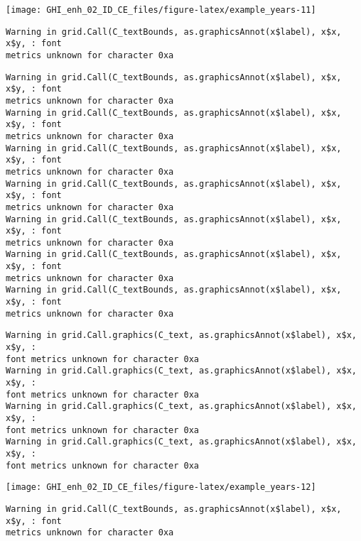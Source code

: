 \documentclass[
  10pt,
  a4paper,oneside]{article}
\begin{document}
\begin{center}\texttt{[image: GHI\_enh\_02\_ID\_CE\_files/figure-latex/example\_years-11]} \end{center}

\begin{verbatim}
Warning in grid.Call(C_textBounds, as.graphicsAnnot(x$label), x$x, x$y, : font
metrics unknown for character 0xa
\end{verbatim}

\begin{verbatim}
Warning in grid.Call(C_textBounds, as.graphicsAnnot(x$label), x$x, x$y, : font
metrics unknown for character 0xa
Warning in grid.Call(C_textBounds, as.graphicsAnnot(x$label), x$x, x$y, : font
metrics unknown for character 0xa
Warning in grid.Call(C_textBounds, as.graphicsAnnot(x$label), x$x, x$y, : font
metrics unknown for character 0xa
Warning in grid.Call(C_textBounds, as.graphicsAnnot(x$label), x$x, x$y, : font
metrics unknown for character 0xa
Warning in grid.Call(C_textBounds, as.graphicsAnnot(x$label), x$x, x$y, : font
metrics unknown for character 0xa
Warning in grid.Call(C_textBounds, as.graphicsAnnot(x$label), x$x, x$y, : font
metrics unknown for character 0xa
Warning in grid.Call(C_textBounds, as.graphicsAnnot(x$label), x$x, x$y, : font
metrics unknown for character 0xa
\end{verbatim}

\begin{verbatim}
Warning in grid.Call.graphics(C_text, as.graphicsAnnot(x$label), x$x, x$y, :
font metrics unknown for character 0xa
Warning in grid.Call.graphics(C_text, as.graphicsAnnot(x$label), x$x, x$y, :
font metrics unknown for character 0xa
Warning in grid.Call.graphics(C_text, as.graphicsAnnot(x$label), x$x, x$y, :
font metrics unknown for character 0xa
Warning in grid.Call.graphics(C_text, as.graphicsAnnot(x$label), x$x, x$y, :
font metrics unknown for character 0xa
\end{verbatim}

\begin{center}\texttt{[image: GHI\_enh\_02\_ID\_CE\_files/figure-latex/example\_years-12]} \end{center}

\begin{verbatim}
Warning in grid.Call(C_textBounds, as.graphicsAnnot(x$label), x$x, x$y, : font
metrics unknown for character 0xa
\end{verbatim}
\end{document}
